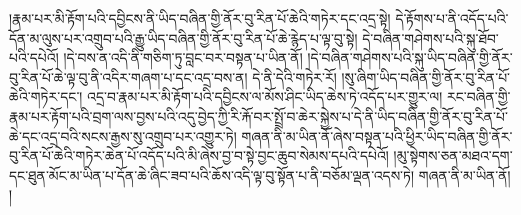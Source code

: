 །རྣམ་པར་མི་རྟོག་པའི་དབྱིངས་ནི་ཡིད་བཞིན་གྱི་ནོར་བུ་རིན་པོ་ཆེའི་གཏེར་དང་འདྲ་སྟེ། དེ་རྟོགས་པ་ནི་འདོད་པའི་དོན་མ་ལུས་པར་འགྲུབ་པའི་རྒྱུ་ཡིད་བཞིན་གྱི་ནོར་བུ་རིན་པོ་ཆེ་རྙེད་པ་ལྟ་བུ་སྟེ། དེ་བཞིན་གཤེགས་པའི་སྐུ་ཐོབ་པའི་དཔེའོ། །དེ་བས་ན་འདི་ནི་གཅིག་ཏུ་བླང་བར་བསྟན་པ་ཡིན་ནོ། །དེ་བཞིན་གཤེགས་པའི་སྐུ་ཡིད་བཞིན་གྱི་ནོར་བུ་རིན་པོ་ཆེ་ལྟ་བུ་ནི་འདིར་གཞག་པ་དང་འདྲ་བས་ན། དེ་ནི་དེའི་གཏེར་རོ། །སུ་ཞིག་ཡིད་བཞིན་གྱི་ནོར་བུ་རིན་པོ་ཆེའི་གཏེར་དང་། འདྲ་བ་རྣམ་པར་མི་རྟོག་པའི་དབྱིངས་ལ་མོས་ཤིང་ཡིད་ཆེས་ཏེ་འདོད་པར་གྱུར་ལ། རང་བཞིན་གྱི་རྣམ་པར་རྟོག་པའི་བྲག་ལས་བྱས་པའི་འདུ་བྱེད་ཀྱི་རི་རྐོ་བར་སྤྲོ་བ་ཆེར་སྐྱེས་པ་དེ་ནི་ཡིད་བཞིན་གྱི་ནོར་བུ་རིན་པོ་ཆེ་དང་འདྲ་བའི་སངས་རྒྱས་སུ་འགྲུབ་པར་འགྱུར་ཏེ། གཞན་ནི་མ་ཡིན་ནོ་ཞེས་བསྟན་པའི་ཕྱིར་ཡིད་བཞིན་གྱི་ནོར་བུ་རིན་པོ་ཆེའི་གཏེར་ཆེན་པོ་འདོད་པའི་མི་ཞེས་བྱ་བ་སྟེ་བྱང་ཆུབ་སེམས་དཔའི་དཔེའོ། །མུ་སྟེགས་ཅན་མཐའ་དག་དང་ཐུན་མོང་མ་ཡིན་པ་དོན་ཆེ་ཞིང་ཟབ་པའི་ཆོས་འདི་ལྟ་བུ་སྟོན་པ་ནི་བཅོམ་ལྡན་འདས་ཏེ། གཞན་ནི་མ་ཡིན་ནོ། །
